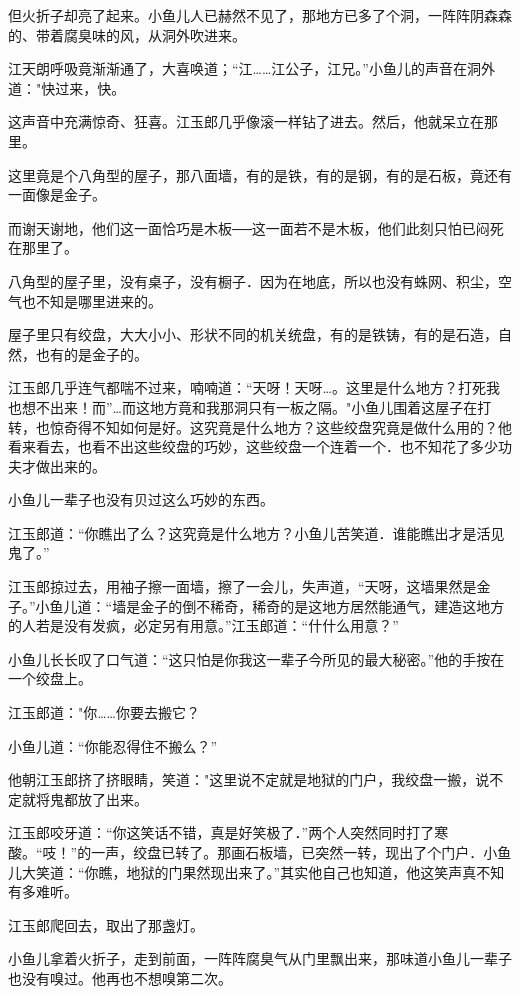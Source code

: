 \documentclass[12pt,oneside]{book}
\begin{document}
但火折子却亮了起来。小鱼儿人已赫然不见了，那地方已多了个洞，一阵阵阴森森的、带着腐臭味的风，从洞外吹进来。

江天朗呼吸竟渐渐通了，大喜唤道；``江\ldots\ldots 江公子，江兄。''小鱼儿的声音在洞外道："快过来，快。

这声音中充满惊奇、狂喜。江玉郎几乎像滚一样钻了进去。然后，他就呆立在那里。

这里竟是个八角型的屋子，那八面墙，有的是铁，有的是钢，有的是石板，竟还有一面像是金子。

而谢天谢地，他们这一面恰巧是木板──这一面若不是木板，他们此刻只怕已闷死在那里了。

八角型的屋子里，没有桌子，没有橱子．因为在地底，所以也没有蛛网、积尘，空气也不知是哪里进来的。

屋子里只有绞盘，大大小小、形状不同的机关统盘，有的是铁铸，有的是石造，自然，也有的是金子的。

江玉郎几乎连气都喘不过来，喃喃道：``天呀！天呀\ldots。这里是什么地方？打死我也想不出来！而''\ldots 而这地方竟和我那洞只有一板之隔。"小鱼儿围着这屋子在打转，也惊奇得不知如何是好。这究竟是什么地方？这些绞盘究竟是做什么用的？他看来看去，也看不出这些绞盘的巧妙，这些绞盘一个连着一个．也不知花了多少功夫才做出来的。

小鱼儿一辈子也没有贝过这么巧妙的东西。

江玉郎道：``你瞧出了么？这究竟是什么地方？小鱼儿苦笑道．谁能瞧出才是活见鬼了。''

江玉郎掠过去，用袖子擦一面墙，擦了一会儿，失声道，``天呀，这墙果然是金子。''小鱼儿道：``墙是金子的倒不稀奇，稀奇的是这地方居然能通气，建造这地方的人若是没有发疯，必定另有用意。''江玉郎道：``什什么用意？''

小鱼儿长长叹了口气道：``这只怕是你我这一辈子今所见的最大秘密。''他的手按在一个绞盘上。

江玉郎道："你\ldots\ldots 你要去搬它？

小鱼儿道：``你能忍得住不搬么？''

他朝江玉郎挤了挤眼睛，笑道："这里说不定就是地狱的门户，我绞盘一搬，说不定就将鬼都放了出来。

江玉郎咬牙道：``你这笑话不错，真是好笑极了．''两个人突然同时打了寒酸。``吱！''的一声，绞盘已转了。那画石板墙，已突然一转，现出了个门户．小鱼儿大笑道：``你瞧，地狱的门果然现出来了。''其实他自己也知道，他这笑声真不知有多难听。

江玉郎爬回去，取出了那盏灯。

小鱼儿拿着火折子，走到前面，一阵阵腐臭气从门里飘出来，那味道小鱼儿一辈子也没有嗅过。他再也不想嗅第二次。
\end{document}
